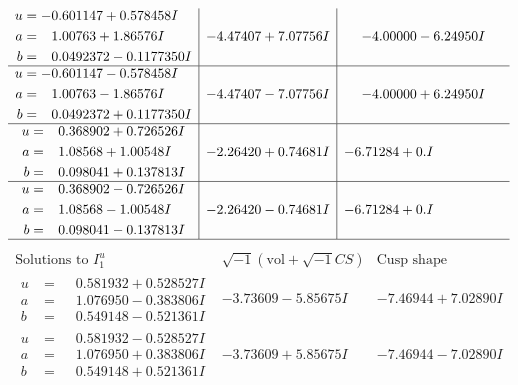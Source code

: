 \documentclass[1p]{elsarticle_modified}
\theoremstyle{definition}
\newcommand{\I}{\sqrt{-1}}
\begin{document}
$$\begin{array}{c|c|c}
\begin{aligned}
u &= -0.601147 + 0.578458 I \\
a &= \phantom{-}1.00763 + 1.86576 I \\
b &= \phantom{-}0.0492372 - 0.1177350 I\end{aligned}
 & -4.47407 + 7.07756 I & -4.00000 - 6.24950 I \\ \hline\begin{aligned}
u &= -0.601147 - 0.578458 I \\
a &= \phantom{-}1.00763 - 1.86576 I \\
b &= \phantom{-}0.0492372 + 0.1177350 I\end{aligned}
 & -4.47407 - 7.07756 I & -4.00000 + 6.24950 I \\ \hline\begin{aligned}
u &= \phantom{-}0.368902 + 0.726526 I \\
a &= \phantom{-}1.08568 + 1.00548 I \\
b &= \phantom{-}0.098041 + 0.137813 I\end{aligned}
 & -2.26420 + 0.74681 I & -6.71284 + 0. I\phantom{ +0.000000I} \\ \hline\begin{aligned}
u &= \phantom{-}0.368902 - 0.726526 I \\
a &= \phantom{-}1.08568 - 1.00548 I \\
b &= \phantom{-}0.098041 - 0.137813 I\end{aligned}
 & -2.26420 - 0.74681 I & -6.71284 + 0. I\phantom{ +0.000000I}\\
 \hline 
 \end{array}$$\newpage$$\begin{array}{c|c|c}  
\text{Solutions to }I^u_{1}& \I (\text{vol} + \sqrt{-1}CS) & \text{Cusp shape}\\
 \hline 
\begin{aligned}
u &= \phantom{-}0.581932 + 0.528527 I \\
a &= \phantom{-}1.076950 - 0.383806 I \\
b &= \phantom{-}0.549148 - 0.521361 I\end{aligned}
 & -3.73609 - 5.85675 I & -7.46944 + 7.02890 I \\ \hline\begin{aligned}
u &= \phantom{-}0.581932 - 0.528527 I \\
a &= \phantom{-}1.076950 + 0.383806 I \\
b &= \phantom{-}0.549148 + 0.521361 I\end{aligned}
 & -3.73609 + 5.85675 I & -7.46944 - 7.02890 I \\ \hline\begin{aligned}

\end{aligned}
\end{array}$$
\end{document}

